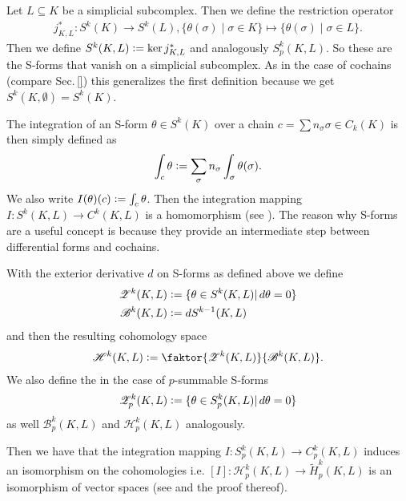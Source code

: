 \documentclass[12pt,a4paper]{article}
\numberwithin{equation}{subsection}
\numberwithin{lemma}{subsection}
\theoremstyle{definition}
\begin{document}
Let $L \subseteq K$ be a simplicial subcomplex. Then we define the 
restriction operator 
\begin{align*}
    j^*_{K,L}: S^k(K) \rightarrow S^k(L),
    \{ \theta(\sigma) \mid \sigma \in K \} 
    \mapsto \{ \theta(\sigma) \mid \sigma \in L \}.
\end{align*}
Then we define $S^k(K,L) \vcentcolon= \ker j^*_{K,L}$ and analogously
$S^k_p(K,L)$. So these are the S-forms that vanish on a simplicial subcomplex.
As in the case of cochains (compare Sec.\,\ref{}) this generalizes 
the first definition because we get $S^k(K,\emptyset) = S^k(K)$.

The integration of an S-form $\theta \in S^k(K)$ over a chain
$c = \sum n_\sigma \sigma \in C_k(K)$ is then simply defined as 
\begin{align*}
    \int_c \theta 
    \vcentcolon= \sum\limits_\sigma n_\sigma \int_\sigma \theta(\sigma).
\end{align*}
We also write $I(\theta)(c) \vcentcolon= \int_c \theta$.
Then the integration mapping 
$I: S^k(K,L) \rightarrow C^k(K,L)$ is a homomorphism
(see \cite[p.191]{goldshtein}).
The reason why S-forms are a useful concept is because they provide an 
intermediate step between differential forms and cochains.

With the exterior derivative $d$ on S-forms as defined above we define 
\begin{align*}
    \mathscr{Z}^k(K,L) &\vcentcolon= \{ \theta \in S^k(K,L) 
        | \, d\theta = 0 \} \\
    \mathscr{B}^k(K,L) &\vcentcolon= dS^{k-1}(K,L)
\end{align*}
and then the resulting cohomology space
\begin{align*}
    \mathscr{H}^k(K,L) \vcentcolon= 
    \faktor{\mathscr{Z}^k(K,L)}{\mathscr{B}^k(K,L)}.
\end{align*}
We also define the in the case of $p$-summable S-forms
\begin{align*}
    \mathscr{Z}_p^k(K,L) &\vcentcolon= \{ \theta \in S_p^k(K,L) | \, d\theta = 0 \} \\
\end{align*}
as well $\mathscr{B}_p^k(K,L)$ and $\mathscr{H}_p^k(K,L)$ analogously.

Then we have that the integration mapping
$I: S_p^k(K,L) \rightarrow C_p^k(K,L)$ 
induces an isomorphism on the cohomologies i.e. 
$[I]: \mathscr{H}_p^k(K,L) \rightarrow 
\tilde{H}_p^k(K,L)$ is an isomorphism of vector 
spaces (see \cite[Thm.\,1]{goldshtein} and the proof thereof).
\end{document}
